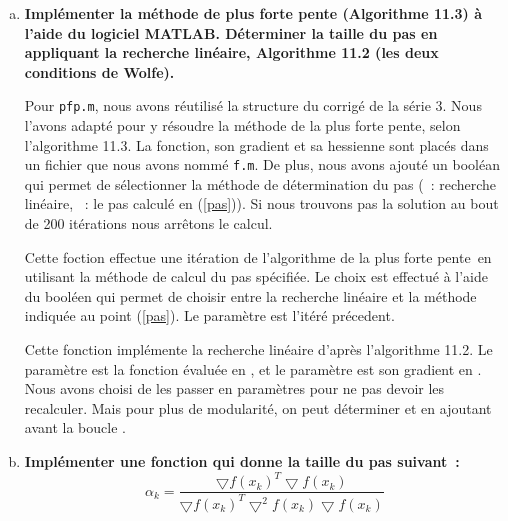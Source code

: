 \documentclass[11pt,a4paper,twoside,onecolumn,titlepage]{report}
\newcommand{\pfp}{plus forte pente}
\newcommand{\question}[1]{\textbf{#1}}
\begin{document}
\begin{enumerate}[(a)]
\item\label{pfp} \question{Implémenter la méthode de plus forte pente (Algorithme 11.3) à l'aide du logiciel MATLAB. Déterminer la taille du pas en appliquant la recherche linéaire, Algorithme 11.2 (les deux conditions de Wolfe).}

%
%

Pour \texttt{pfp.m}, nous avons réutilisé la structure du corrigé de la série 3. Nous l'avons adapté pour y résoudre la méthode de la plus forte pente, selon l'algorithme 11.3. La fonction, son gradient et sa hessienne sont placés dans un fichier que nous avons nommé \texttt{f.m}. De plus, nous avons ajouté un booléan  qui permet de sélectionner la méthode de détermination du pas (~: recherche linéaire, ~: le pas calculé en (\ref{pas})). Si nous trouvons pas la solution au bout de 200 itérations nous arrêtons le calcul.



Cette foction effectue une itération de l'algorithme de la \pfp\ en utilisant la méthode de calcul du pas spécifiée. Le choix est effectué à l'aide du booléen  qui permet de choisir entre la recherche linéaire et la méthode indiquée au point (\ref{pas}). Le paramètre  est l'itéré précedent.

%
%
\newpage

Cette fonction implémente la recherche linéaire d'après l'algorithme 11.2. Le paramètre  est la fonction évaluée en , et le paramètre  est son gradient en . Nous avons choisi de les passer en paramètres pour ne pas devoir les recalculer. Mais pour plus de modularité, on peut déterminer  et  en ajoutant  avant la boucle .

%
%
%

\item\label{pas} \question{Implémenter une fonction qui donne la taille du pas suivant~:}
\begin{equation}\label{eq:cauchy}
\alpha_k = \frac{\bigtriangledown f(x_k)^T \bigtriangledown f(x_k)}{\bigtriangledown f(x_k)^T \bigtriangledown^2 f(x_k) \bigtriangledown f(x_k)}
\end{equation}


\end{enumerate}
\end{document}
